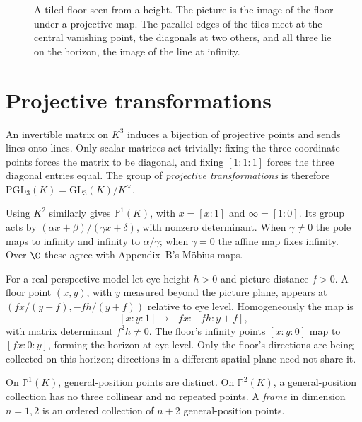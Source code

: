 \begin{figure}[ht]
\centering
{}
\caption{A tiled floor seen from a height. The picture is the image of the floor under a projective map. The parallel edges of the tiles
meet at the central vanishing point, the diagonals at two others, and all three lie on the horizon, the image of the line at infinity.}
\label{geometry:fig:floor}
\end{figure}

\section{Projective transformations}

An invertible matrix on $K^3$ induces a bijection of projective points and sends lines onto lines. Only scalar matrices act trivially: fixing the three coordinate points forces the matrix to be diagonal, and fixing $[1:1:1]$ forces the three diagonal entries equal. The group of \emph{projective transformations} is therefore $\mathrm{PGL}_3(K)=\mathrm{GL}_3(K)/K^\times$.

Using $K^2$ similarly gives $\mathbb P^1(K)$, with $x=[x:1]$ and $\infty=[1:0]$. Its group acts by $(\alpha x+\beta)/(\gamma x+\delta)$, with nonzero determinant. When $\gamma\ne0$ the pole maps to infinity and infinity to $\alpha/\gamma$; when $\gamma=0$ the affine map fixes infinity. Over $\C$ these agree with Appendix~B's M\"obius maps.

For a real perspective model let eye height $h>0$ and picture distance $f>0$. A floor point $(x,y)$, with $y$ measured beyond the picture plane, appears at $(fx/(y+f),-fh/(y+f))$ relative to eye level. Homogeneously the map is
\[
[x:y:1]\longmapsto[fx:-fh:y+f],
\]
with matrix determinant $f^2h\ne0$. The floor's infinity points $[x:y:0]$ map to $[fx:0:y]$, forming the horizon at eye level. Only the floor's directions are being collected on this horizon; directions in a different spatial plane need not share it.

\begin{definition}
On $\mathbb P^1(K)$, general-position points are distinct. On $\mathbb P^2(K)$, a general-position collection has no three collinear and no repeated points. A \emph{frame} in dimension $n=1,2$ is an ordered collection of $n+2$ general-position points.
\end{definition}


